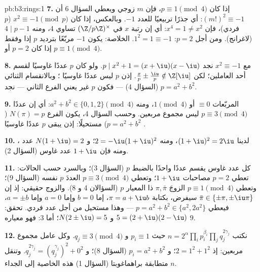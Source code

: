 \begin{solution}{pb:b3:rings:1}
\textbf{7.} إذا كان $p \equiv 1 \pmod 4$، فإن $m$ زوجي ويعطي السؤال 6 أن
$(m!)^2 \equiv -1$: أي جذرًا تربيعيًا للعدد $-1$. وبالعكس، إذا كان $x^2 \equiv -1 \pmod p$
($p$ فردي)، فإن $x^4 = 1 \neq x^2$: أي إن رتبة $x$ في $(\Z/p\Z)^\times$ تساوي $4$،
ومنه $4 \mid p - 1$ (لاغرانج). ومن أجل $p = 2$: $1^2 = 1 \equiv -1$.
الخلاصة: يكون $-1$ مربّعًا بترديد $p$ إذا وفقط إذا كان $p = 2$
أو $p \equiv 1 \pmod 4$.

\textbf{8.} مع $x^2 \equiv -1$ نجد $p \mid x^2 + 1 = (x + \iu)(x -
\iu)$. ولو كان $p$ عددًا
غاوسيًا  لقسم أحد العاملين؛ لكن $\frac xp \pm \frac \iu p \notin \Z[\iu]$. إذن $p$ ليس عددًا
غاوسيًا ؛ وبالانقسام الثنائي (السؤال 4) --- فكون $p$ غير
 يعني الفرع الثاني --- نجد $p = a^2 + b^2$.

\textbf{9.} المربّعات $\equiv 0$ أو $1 \pmod 4$، ومنه $a^2 + b^2
\in \{0, 1, 2\} \pmod 4$:
أي إن عددًا  $p \equiv 3 \pmod 4$ ليس مجموع مربعين. وحسب السؤال 4،
يكون الفرع $N(\pi) = p$ ($p =
a^2+b^2$) مستحيلًا: إذن يبقى $p$ عددًا
غاوسيًا .

\textbf{10.} لدينا $(1 + \iu)^2 = 2\iu$، ومنه $2 = -\iu(1 + \iu)^2$؛ و $N(1 + \iu) = 2$
عدد ، ومنه فإن $1 + \iu$ عدد غاوس  (السؤال 2).

\textbf{11.} كل عدد غاوس  يقسم عددًا  واحدًا بالضبط
$p$ (السؤال 3)؛ وبالسرد حسب الحالات: تعطي $p = 2$ مصاحبات
$1 + \iu$؛ وتعطي $p \equiv 3 \pmod 4$ العددَ $p$ نفسه (السؤال 9)؛ وتعطي
$p \equiv 1 \pmod 4$ الزوجَ $\pi, \bar\pi$ ذا المعيار $p$ (السؤالان 4 و 8).
والزوج حقيقي: إذ إن $\bar\pi \in
\{\pm\pi, \pm\iu\pi\}$ سيفرض، بكتابة $\pi = a + \iu b$، إما $b = 0$
وإما $a = 0$ وإما $a = \pm b$، فيعطي $p = a^2 + b^2 \in
\{a^2, 2a^2\}$ --- وهذا مستحيل من
أجل عدد  فردي. تحقق: $5 = (2 + \iu)(2 - \iu)$ و $N(2\pm\iu) = 5$؛ أما $3$:
فهو  معياره $9$.

\textbf{12.} نكتب $n = 2^{\alpha}\prod_i p_i^{\beta_i} \prod_j
q_j^{2\gamma_j}$ حيث $p_i \equiv 1$ و $q_j \equiv 3 \pmod 4$. وكل
عامل مجموع مربعين: إذ $2 = 1^2 + 1^2$؛ و $p_i = a^2
+ b^2$ (السؤال 8)؛
و $q_j^{2\gamma_j} = (q_j^{\gamma_j})^2 +
0^2$. وتنقل متطابقة براهماغوبتا (السؤال 1) هذه الخاصية إلى
الجداء $n$.


\end{solution}

